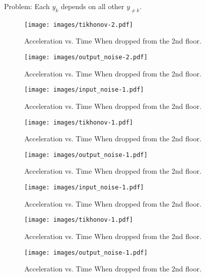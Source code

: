 \documentclass[conference]{IEEEtran}
\begin{document}
Problem: Each $y_k$ depends on all other $y_{\neq k}$.


\begin{figure}
    \texttt{[image: images/tikhonov-2.pdf]}
    \caption{Acceleration vs. Time When dropped from the 2nd floor.}
    \label{fig:my_label}
\end{figure}

\begin{figure}
    \texttt{[image: images/output\_noise-2.pdf]}
    \caption{Acceleration vs. Time When dropped from the 2nd floor.}
    \label{fig:my_label}
\end{figure}


\begin{figure}
    \texttt{[image: images/input\_noise-1.pdf]}
    \caption{Acceleration vs. Time When dropped from the 2nd floor.}
    \label{fig:my_label}
\end{figure}

\begin{figure}
    \texttt{[image: images/tikhonov-1.pdf]}
    \caption{Acceleration vs. Time When dropped from the 2nd floor.}
    \label{fig:my_label}
\end{figure}

\begin{figure}
    \texttt{[image: images/output\_noise-1.pdf]}
    \caption{Acceleration vs. Time When dropped from the 2nd floor.}
    \label{fig:my_label}
\end{figure}

\begin{figure}
    \texttt{[image: images/input\_noise-1.pdf]}
    \caption{Acceleration vs. Time When dropped from the 2nd floor.}
    \label{fig:my_label}
\end{figure}

\begin{figure}
    \texttt{[image: images/tikhonov-1.pdf]}
    \caption{Acceleration vs. Time When dropped from the 2nd floor.}
    \label{fig:my_label}
\end{figure}

\begin{figure}
    \texttt{[image: images/output\_noise-1.pdf]}
    \caption{Acceleration vs. Time When dropped from the 2nd floor.}
    \label{fig:my_label}
\end{figure}

\end{document}
